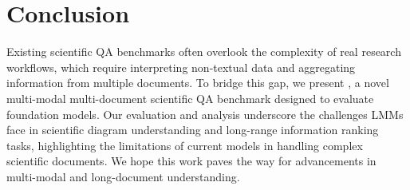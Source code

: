 \section{Conclusion}
%
Existing scientific QA benchmarks often overlook the complexity of real research workflows, which require interpreting non-textual data and aggregating information from multiple documents.
% 
To bridge this gap, we present \data, a novel multi-modal multi-document scientific QA benchmark designed to  evaluate foundation models. 
%
Our evaluation and analysis underscore the challenges LMMs face in scientific diagram understanding and long-range information ranking tasks, highlighting the limitations of current models in handling complex scientific documents.
%
We hope this work paves the way for advancements in multi-modal and long-document understanding.